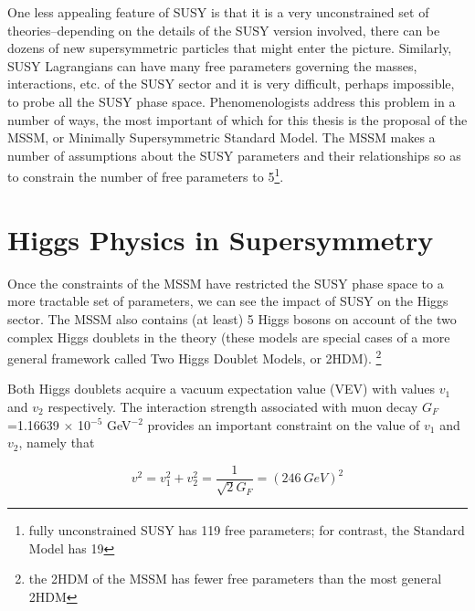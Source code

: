 One less appealing feature of SUSY is that it is a very unconstrained set 
of theories--depending on the details of the SUSY version involved, there can 
be dozens of new supersymmetric particles that might enter 
the picture.  Similarly, SUSY Lagrangians can have many free parameters governing the masses, 
interactions, etc. of the SUSY sector and it is very difficult, perhaps 
impossible, to probe all the SUSY phase space.  Phenomenologists address this problem in 
a number of ways, the most important of which for this thesis is the 
proposal of the MSSM, or Minimally Supersymmetric Standard Model.  The MSSM makes a 
number of assumptions about the SUSY parameters and their relationships so as to constrain the 
number of free parameters to 5\footnote{fully unconstrained SUSY has 119 free parameters; for
contrast, the Standard Model has 19}.  

\section{Higgs Physics in Supersymmetry}
\label{sec:SUSY_Higgs}
Once the constraints of the MSSM have restricted the SUSY phase space to a more 
tractable set of parameters, we can see the impact of SUSY on the Higgs sector.  
The MSSM also contains (at least) 5 Higgs bosons on account of the 
two complex Higgs doublets in the theory (these models are 
special cases of a more general framework called Two Higgs Doublet Models, or 2HDM).
\footnote{the 2HDM of the MSSM has fewer free parameters than the most general 2HDM}  



Both Higgs doublets acquire a vacuum expectation value (VEV) with values $v_1$ 
and $v_2$ respectively.  The interaction strength associated with
muon decay $G_F$=1.16639 $\times$ 10$^{-5}$ GeV$^{-2}$ 
provides an important constraint on the value of $v_1$ and $v_2$, namely that 

\begin{equation}
	v^2 = v_1^2 + v_2^2 = \frac{1}{\sqrt{2}G_F} = (246\ GeV)^2
	\label{eq:h_246}
\end{equation}


